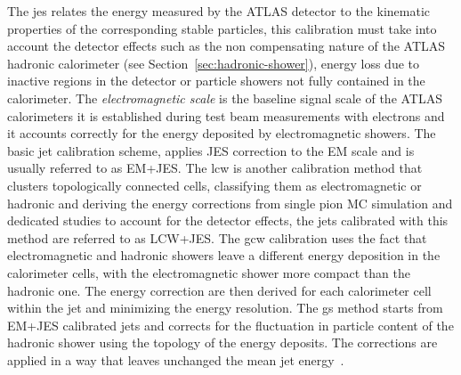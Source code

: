 The \gls{jes} relates the energy measured by the ATLAS detector to the kinematic
properties of the corresponding stable particles, this calibration must take
into account the detector effects such as the non compensating nature of the
ATLAS hadronic calorimeter (see Section~\ref{sec:hadronic-shower}), energy loss
due to inactive regions in the detector or particle showers not fully contained
in the calorimeter. The \emph{electromagnetic scale} is the baseline signal
scale of the ATLAS calorimeters it is established during test beam measurements
with electrons and it accounts correctly for the energy deposited by
electromagnetic showers. The basic jet calibration scheme, applies JES
correction to the EM scale and is usually referred to as EM+JES. The \gls{lcw}
is another calibration method that clusters topologically connected cells,
classifying them as electromagnetic or hadronic and deriving the energy
corrections from single pion MC simulation and dedicated studies to account for
the detector effects, the jets calibrated with this method are referred to as
LCW+JES\@. The \gls{gcw} calibration uses the fact that electromagnetic and
hadronic showers leave a different energy deposition in the calorimeter cells,
with the electromagnetic shower more compact than the hadronic one. The energy
correction are then derived for each calorimeter cell within the jet and
minimizing the energy resolution. The \gls{gs} method starts from EM+JES
calibrated jets and corrects for the fluctuation in particle content of the
hadronic shower using the topology of the energy deposits. The corrections are
applied in a way that leaves unchanged the mean jet energy~\cite{JetCalib}.
